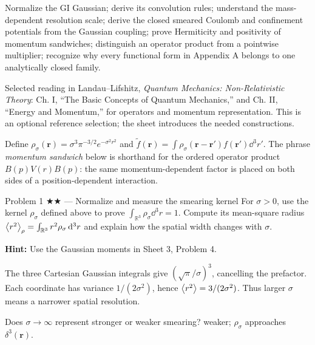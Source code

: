 \documentclass[11pt]{article}
\begin{document}

\begin{goals}
Normalize the GI Gaussian; derive its convolution rules; understand the
mass-dependent resolution scale; derive the closed smeared Coulomb and
confinement potentials from the Gaussian coupling; prove Hermiticity and
positivity of momentum sandwiches; distinguish an operator product from a
pointwise multiplier; recognize why every functional form in Appendix A belongs
to one analytically closed family.
\end{goals}
\begin{reading}
Selected reading in Landau--Lifshitz, \emph{Quantum Mechanics: Non-Relativistic
Theory}: Ch. I, ``The Basic Concepts of Quantum Mechanics,'' and Ch. II,
``Energy and Momentum,'' for operators and momentum representation. This is an
optional reference selection; the sheet introduces the needed constructions.
\end{reading}


Define
$\rho_\sigma(\bm r)=\sigma^3\pi^{-3/2}e^{-\sigma^2r^2}$ and
$\widetilde f(\bm r)=\int\rho_\sigma(\bm r-\bm r')f(\bm r')\dd^3r'$.
The phrase \emph{momentum sandwich} below is shorthand for the ordered operator
product $B(p)V(r)B(p)$: the same momentum-dependent factor is placed on both
sides of a position-dependent interaction.

\begin{problem}{Problem 1 ★★ — Normalize and measure the smearing kernel}
For $\sigma>0$, use the kernel $\rho_\sigma$ defined above to prove
$\int_{\mathbb R^3}\rho_\sigma\dd^3r=1$. Compute its mean-square radius
$\left\langle r^2\right\rangle_\rho=\int_{\mathbb R^3}r^2\rho_\sigma\,\mathrm d^3r$
and explain how the spatial width changes with $\sigma$.

\textbf{Hint:} Use the Gaussian moments in Sheet 3, Problem 4.
\end{problem}
\begin{solution}
The three Cartesian Gaussian integrals give
$(\sqrt\pi/\sigma)^3$, cancelling the prefactor. Each coordinate has variance
$1/(2\sigma^2)$, hence $\left\langle r^2\right\rangle=3/(2\sigma^2)$. Thus larger $\sigma$
means a narrower spatial resolution.
\end{solution}
\begin{quiz}
Does $\sigma\to\infty$ represent stronger or weaker smearing? \answer weaker;
$\rho_\sigma$ approaches $\delta^3(\bm r)$.
\end{quiz}
\end{document}
